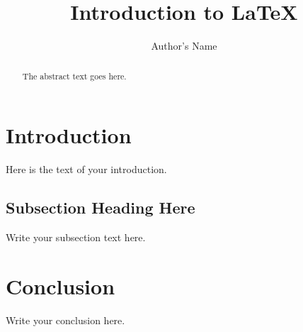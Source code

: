 \documentclass{article}
\begin{document}
\title{Introduction to \LaTeX{}}
\author{Author's Name}

\maketitle

\begin{abstract}
The abstract text goes here.
\end{abstract}

\section{Introduction}
Here is the text of your introduction.

\subsection{Subsection Heading Here}
Write your subsection text here.



\section{Conclusion}
Write your conclusion here.
\end{document}
